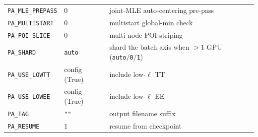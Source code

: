 \documentclass[11pt]{article}
\newcommand{\code}[1]{\texttt{\small #1}}
\begin{document}
\begin{longtable}{p{}p{}p{}}
\code{PA\_MLE\_PREPASS} & $0$ & joint-MLE auto-centering pre-pass \\
\code{PA\_MULTISTART} & $0$ & multistart global-min check \\
\code{PA\_POI\_SLICE} & $0$ & multi-node POI striping \\
\code{PA\_SHARD} & \code{auto} & shard the batch axis when $>1$ GPU (\code{auto}/\code{0}/\code{1}) \\
\code{PA\_USE\_LOWTT} & config (True) & include low-$\ell$ TT \\
\code{PA\_USE\_LOWEE} & config (True) & include low-$\ell$ EE \\
\code{PA\_TAG} & \texttt{""} & output filename suffix \\
\code{PA\_RESUME} & $1$ & resume from checkpoint \\
\bottomrule
\end{longtable}
\end{document}
